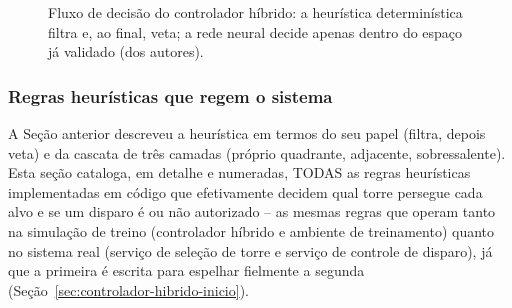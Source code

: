 \documentclass[12pt,a4paper]{article}
\begin{document}
\begin{figure}[htbp]
  \centering
  \caption{Fluxo de decisão do controlador híbrido: a heurística determinística filtra e, ao final,
  veta; a rede neural decide apenas dentro do espaço já validado (dos autores).}
\end{figure}

\subsubsection{Regras heurísticas que regem o sistema}
\label{sec:regras-heuristicas}

A Seção anterior descreveu a heurística em termos do seu papel (filtra, depois veta) e da cascata
de três camadas (próprio quadrante, adjacente, sobressalente). Esta seção cataloga, em detalhe e
numeradas, TODAS as regras heurísticas implementadas em código que efetivamente decidem qual torre
persegue cada alvo e se um disparo é ou não autorizado -- as mesmas regras que operam tanto na
simulação de treino (controlador híbrido e ambiente de treinamento) quanto no sistema
real (serviço de seleção de torre e serviço de controle de disparo), já que a primeira é escrita
para espelhar fielmente a segunda (Seção~\ref{sec:controlador-hibrido-inicio}).
\end{document}
